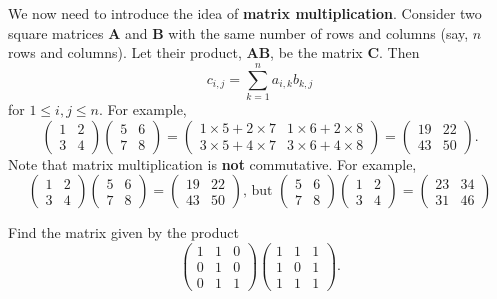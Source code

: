 We now need to introduce the idea of \textbf{matrix multiplication}. Consider two square matrices \textbf{A} and \textbf{B} with the same number of rows and columns (say, $n$ rows and columns). Let their product, \textbf{AB}, be the matrix \textbf{C}. Then
\[
    c_{i,j} = \sum_{k=1}^n a_{i,k}b_{k,j}
\]
for $1 \leq i, j \leq n$. For example,
\[
    \begin{pmatrix}1 & 2\\3 & 4\end{pmatrix}\begin{pmatrix}5 & 6\\7 & 8\end{pmatrix}
= \begin{pmatrix}1\times5+2\times7 & 1\times6+2\times8\\3\times5+4\times7 & 3\times6+4\times8\end{pmatrix}
= \begin{pmatrix}19 & 22\\43 & 50\end{pmatrix}.
\]
Note that matrix multiplication is \textbf{not} commutative. For example,
\[
\begin{pmatrix}1 & 2\\3 & 4\end{pmatrix}\begin{pmatrix}5 & 6\\7 & 8\end{pmatrix} = \begin{pmatrix}19 & 22\\43 & 50\end{pmatrix} \text{, but } \begin{pmatrix}5 & 6\\7 & 8\end{pmatrix}\begin{pmatrix}1 & 2\\3 & 4\end{pmatrix} = \begin{pmatrix}23 & 34\\31 & 46\end{pmatrix}
\]

\begin{exercise}
    Find the matrix given by the product
    \[
        \begin{pmatrix}1&1&0\\0&1&0\\0&1&1\end{pmatrix}\begin{pmatrix}1&1&1\\1&0&1\\1&1&1\end{pmatrix}.
    \]
\end{exercise}

